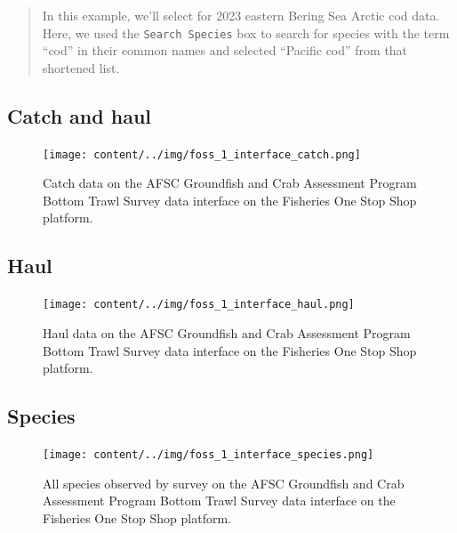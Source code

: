 \documentclass[
  letterpaper,
  oneside,
  open=any]{scrbook}
\begin{document}
\begin{quote}
In this example, we'll select for 2023 eastern Bering Sea Arctic cod
data. Here, we used the \texttt{Search\ Species} box to search for
species with the term ``cod'' in their common names and selected
``Pacific cod'' from that shortened list.
\end{quote}

\subsection{Catch and haul}\label{catch-and-haul}

\begin{figure}[H]

{\centering \texttt{[image: content/../img/foss\_1\_interface\_catch.png]}

}

\caption{Catch data on the AFSC Groundfish and Crab Assessment Program
Bottom Trawl Survey data interface on the Fisheries One Stop Shop
platform.}

\end{figure}%

\subsection{Haul}\label{haul}

\begin{figure}[H]

{\centering \texttt{[image: content/../img/foss\_1\_interface\_haul.png]}

}

\caption{Haul data on the AFSC Groundfish and Crab Assessment Program
Bottom Trawl Survey data interface on the Fisheries One Stop Shop
platform.}

\end{figure}%

\subsection{Species}\label{species}

\begin{figure}[H]

{\centering \texttt{[image: content/../img/foss\_1\_interface\_species.png]}

}

\caption{All species observed by survey on the AFSC Groundfish and Crab
Assessment Program Bottom Trawl Survey data interface on the Fisheries
One Stop Shop platform.}

\end{figure}%
\end{document}
